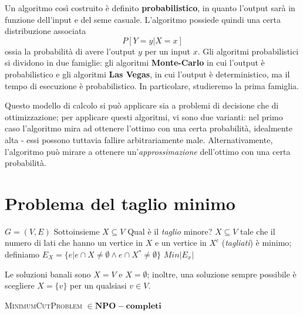 Un algoritmo così costruito è definito \textbf{probabilistico}, in quanto l'output
sarà in funzione dell'input e del seme casuale. L'algoritmo possiede quindi
una certa distribuzione associata
$$
	P[Y = y | X = x]
$$
ossia la probabilità di avere l'output $y$ per un input $x$. Gli algoritmi
probabilistici si dividono in due famiglie:
gli algoritmi \textbf{Monte-Carlo} in cui l'output è probabilistico e gli algoritmi
\textbf{Las Vegas}, in cui l'output è deterministico, ma il tempo di esecuzione
è probabilistico. In particolare, studieremo la prima famiglia.

Questo modello di calcolo
si può applicare sia a problemi di decisione che di ottimizzazione; per applicare
questi algoritmi, vi sono due varianti: nel primo caso l'algoritmo mira ad
ottenere l'ottimo con una certa probabilità, idealmente alta - essi possono
tuttavia fallire arbitrariamente male. Alternativamente, l'algoritmo può
mirare a ottenere un'\textit{approssimazione} dell'ottimo con una certa
probabilità.

\section{Problema del taglio minimo}
 {$G = (V,E)$} {Sottoinsieme $X \subseteq V$}
{Qual è il \textit{taglio} minore?}
{
	$X \subseteq V$ tale che il numero di lati che hanno un vertice in $X$ e un vertice
	in $X^c$ (\textit{tagliati}) è minimo;
	definiamo
	$E_X = \{e | e \cap X \neq \emptyset \land e \cap X^* \neq \emptyset\}$
}
{$Min$}{$|E_x|$}


Le soluzioni banali sono $X = V$ e $X = \emptyset$; inoltre, una soluzione
sempre possibile è scegliere $X = \{ v \}$ per un qualsiasi $v \in V$.

\begin{theorem}
	\textsc{MinimumCutProblem} $\in \mathbf{NPO-completi}$
\end{theorem}

